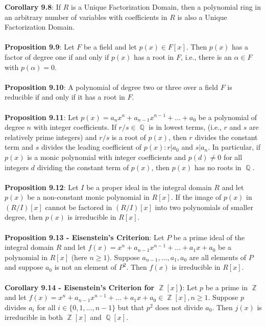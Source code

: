 \documentclass{article}
\DeclareMathOperator{\Z}{\mathbb{Z}}
\DeclareMathOperator{\Q}{\mathbb{Q}}
\begin{document}
\textbf{Corollary 9.8}: If $R$ is a Unique Factorization Domain, then a polynomial ring in an arbitrary number of variables with coefficients in $R$ is also a Unique Factorization Domain. \\ \\
\textbf{Proposition 9.9}: Let $F$ be a field and let $p(x) \in F[x]$. Then $p(x)$ has a factor of degree one if and only if $p(x)$ has a root in $F$, i.e., there is an $\alpha \in F$ with $p(\alpha) = 0$. \\ \\
\textbf{Proposition 9.10}: A polynomial of degree two or three over a field $F$ is reducible if and only if it has a root in $F$. \\ \\
\textbf{Proposition 9.11}: Let $p(x) = a_nx^n + a_{n - 1}x^{n - 1} + \dots + a_0$ be a polynomial of degree $n$ with integer coefficients. If $r/s \in \Q$ is in lowest terms, (i.e., $r$ and $s$ are relatively prime integers) and $r/s$ is a root of $p(x)$, then $r$ divides the constant term and $s$ divides the leading coefficient of $p(x): r | a_0$ and $s | a_n$. In particular, if $p(x)$ is a monic polynomial with integer coefficients and $p(d) \neq  0$ for all integers $d$ dividing the constant term of $p(x)$, then $p(x)$ has no roots in $\Q$. \\ \\
\textbf{Proposition 9.12}: Let $I$ be a proper ideal in the integral domain $R$ and let $p(x)$ be a non-constant monic polynomial in $R[x]$. If the image of $p(x)$ in $(R/I)[x]$ cannot be factored in $(R/I)[x]$ into two polynomials of smaller degree, then $p(x)$ is irreducible in $R[x]$. \\ \\
\textbf{Proposition 9.13 - Eisenstein's Criterion}: Let $P$ be a prime ideal of the integral domain $R$ and let $f(x) = x^n +a_{n - 1}x^{n - 1} + \dots + a_1x + a_0$ be a polynomial in $R[x]$ (here $n \geq 1$). Suppose $a_{n - 1}, \dots, a_1, a_0$ are all elements of $P$ and suppose $a_0$ is not an element of $P^2$. Then $f(x)$ is irreducible in $R[x]$. \\ \\
\textbf{Corollary 9.14 - Eisenstein's Criterion for $\Z[x]$)}: Let $p$ be a prime in $\Z$ and let
$f(x) = x^n +a_{n - 1}x^{n - 1} + \dots + a_1x + a_0 \in \Z[x], n \geq 1$. Suppose $p$ divides $a_i$ for all $i \in \{0, 1, \dots, n - 1\}$ but that $p^2$ does not divide $a_0$. Then $j(x)$ is irreducible in both $\Z[x]$ and $\Q[x]$. \\ \\
\end{document}
